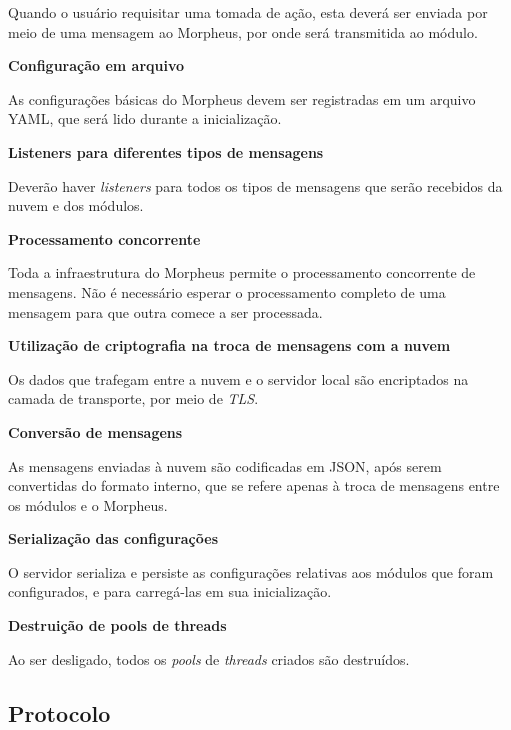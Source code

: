 \begin{description}
Quando o usuário requisitar uma tomada de ação, esta deverá ser enviada por meio de uma mensagem ao Morpheus, por onde será transmitida ao módulo.

\item \textbf{Configuração em arquivo}

As configurações básicas do Morpheus devem ser registradas em um arquivo YAML, que será lido durante a inicialização.

\item \textbf{Listeners para diferentes tipos de mensagens}

Deverão haver \emph{listeners} para todos os tipos de mensagens que serão recebidos da nuvem e dos módulos.

\item \textbf{Processamento concorrente}

Toda a infraestrutura do Morpheus permite o processamento concorrente de mensagens. Não é necessário esperar o processamento completo de uma mensagem para que outra comece a ser processada.

\item \textbf{Utilização de criptografia na troca de mensagens com a nuvem}

Os dados que trafegam entre a nuvem e o servidor local são encriptados na camada de transporte, por meio de \emph{TLS}.

\item \textbf{Conversão de mensagens}

As mensagens enviadas à nuvem são codificadas em JSON, após serem convertidas do formato interno, que se refere apenas à troca de mensagens entre os módulos e o Morpheus.

\item \textbf{Serialização das configurações}

O servidor serializa e persiste as configurações relativas aos módulos que foram configurados, e para carregá-las em sua inicialização.

\item \textbf{Destruição de pools de threads}

Ao ser desligado, todos os \emph{pools} de \emph{threads} criados são destruídos.

\end{description}

\subsection{Protocolo}

